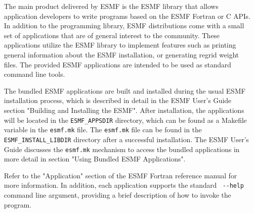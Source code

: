 
The main product delivered by ESMF is the ESMF library that allows application
developers to write programs based on the ESMF Fortran or C APIs. In addition to 
the programming library, ESMF distributions come with a small set of applications
that are of general interest to the community. These applications utilize
the ESMF library to implement features such as printing general information
about the ESMF installation, or generating regrid weight files. The provided
ESMF applications are intended to be used as standard command line tools.

The bundled ESMF applications are built and installed during the usual ESMF 
installation process, which is described in detail in the ESMF User's Guide 
section "Building and Installing the ESMF". After installation, the
applications will be located in the {\tt ESMF\_APPSDIR} directory, which can 
be found as a Makefile variable in the {\tt esmf.mk} file. The {\tt esmf.mk} 
file can be found in the {\tt ESMF\_INSTALL\_LIBDIR} directory after a 
successful installation.  The ESMF User's Guide discusses the {\tt esmf.mk} 
mechanism to access the bundled applications in more detail in section 
"Using Bundled ESMF Applications".

Refer to the "Application" section of the ESMF Fortran reference manual
for more information. In addition, each application supports the standard 
\verb+ --help + command line argument, providing a brief description of 
how to invoke the program.


